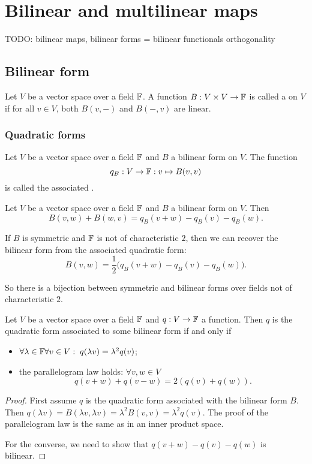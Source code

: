 \chapter{Bilinear and multilinear maps}
TODO: bilinear maps, bilinear forms = bilinear functionals
orthogonality

\section{Bilinear form}
\begin{definition}
Let $V$ be a vector space over a field $\mathbb{F}$. A function $B:V\times V\to \mathbb{F}$ is called a  on $V$ if for all $v\in V$, both $B(v,-)$ and $B(-,v)$ are linear.
\end{definition}

\subsection{Quadratic forms}
\begin{definition}
Let $V$ be a vector space over a field $\mathbb{F}$ and $B$ a bilinear form on $V$. The function
\[ q_B: V\to \mathbb{F}: v\mapsto B(v,v) \]
is called the associated .
\end{definition}

\begin{proposition}
Let $V$ be a vector space over a field $\mathbb{F}$ and $B$ a bilinear form on $V$. Then
\[ B(v,w) + B(w,v) = q_B(v+w) - q_B(v) - q_B(w). \]
\end{proposition}
\begin{corollary}
If $B$ is symmetric and $\mathbb{F}$ is not of characteristic $2$, then we can recover the bilinear form from the associated quadratic form:
\[ B(v,w) = \frac{1}{2}\Big(q_B(v+w) - q_B(v) - q_B(w)\Big). \]
\end{corollary}
So there is a bijection between symmetric and bilinear forms over fields not of characteristic $2$.

\begin{proposition}
Let $V$ be a vector space over a field $\mathbb{F}$ and $q: V\to \mathbb{F}$ a function. Then $q$ is the quadratic form associated to some bilinear form \textup{if and only if}
\begin{itemize}
    \item $\forall \lambda \in \mathbb{F}\forall v\in V: \; q(\lambda v) = \lambda^2 q(v)$;
    \item the parallelogram law holds: $\forall v,w\in V$
    \[ q(v+w) + q(v-w) = 2(q(v)+q(w)). \]
\end{itemize}
\end{proposition}
\begin{proof}
First assume $q$ is the quadratic form associated with the bilinear form $B$. Then $q(\lambda v) = B(\lambda v, \lambda v) = \lambda^2 B(v,v) = \lambda^2 q(v)$. The proof of the parallelogram law is the same as in an inner product space.

For the converse, we need to show that $q(v+w) - q(v) - q(w)$ is bilinear.
\end{proof}

